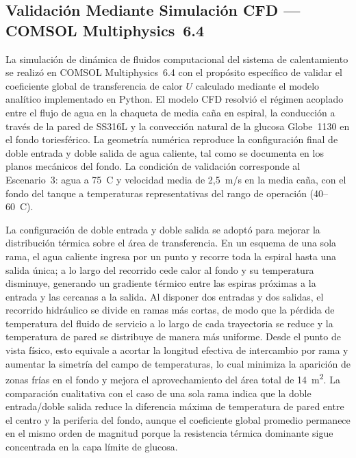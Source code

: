 \subsection{Validaci\'on Mediante Simulaci\'on CFD --- COMSOL Multiphysics~6.4}\label{sec:resultados_cfd_fea}

La simulaci\'on de din\'amica de fluidos computacional del sistema de calentamiento se realiz\'o en COMSOL Multiphysics~6.4 con el prop\'osito espec\'ifico de validar el coeficiente global de transferencia de calor $U$ calculado mediante el modelo anal\'itico implementado en Python. El modelo CFD resolvi\'o el r\'egimen acoplado entre el flujo de agua en la chaqueta de media ca\~na en espiral, la conducci\'on a trav\'es de la pared de SS316L y la convecci\'on natural de la glucosa Globe~1130 en el fondo toriesf\'erico. La geometr\'ia num\'erica reproduce la configuraci\'on final de doble entrada y doble salida de agua caliente, tal como se documenta en los planos mec\'anicos del fondo. La condici\'on de validaci\'on corresponde al Escenario~3: agua a 75~\textdegree C y velocidad media de 2,5~m/s en la media ca\~na, con el fondo del tanque a temperaturas representativas del rango de operaci\'on (40--60~\textdegree C).

La configuraci\'on de doble entrada y doble salida se adopt\'o para mejorar la distribuci\'on t\'ermica sobre el \'area de transferencia. En un esquema de una sola rama, el agua caliente ingresa por un punto y recorre toda la espiral hasta una salida \'unica; a lo largo del recorrido cede calor al fondo y su temperatura disminuye, generando un gradiente t\'ermico entre las espiras pr\'oximas a la entrada y las cercanas a la salida. Al disponer dos entradas y dos salidas, el recorrido hidr\'aulico se divide en ramas m\'as cortas, de modo que la p\'erdida de temperatura del fluido de servicio a lo largo de cada trayectoria se reduce y la temperatura de pared se distribuye de manera m\'as uniforme. Desde el punto de vista f\'isico, esto equivale a acortar la longitud efectiva de intercambio por rama y aumentar la simetr\'ia del campo de temperaturas, lo cual minimiza la aparici\'on de zonas fr\'ias en el fondo y mejora el aprovechamiento del \'area total de 14~m\textsuperscript{2}. La comparaci\'on cualitativa con el caso de una sola rama indica que la doble entrada/doble salida reduce la diferencia m\'axima de temperatura de pared entre el centro y la periferia del fondo, aunque el coeficiente global promedio permanece en el mismo orden de magnitud porque la resistencia t\'ermica dominante sigue concentrada en la capa l\'imite de glucosa.

